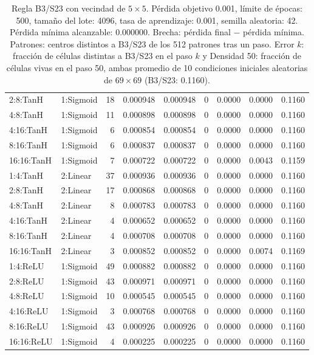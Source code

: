 \begin{table}[H]
\begin{tabular}{llrrrrrrr}
		2:8:TanH & 1:Sigmoid & 18 & 0.000948 & 0.000948 & 0 & 0.0000 & 0.0000 & 0.1160 \\
		4:8:TanH & 1:Sigmoid & 11 & 0.000898 & 0.000898 & 0 & 0.0000 & 0.0000 & 0.1160 \\
		4:16:TanH & 1:Sigmoid & 6 & 0.000854 & 0.000854 & 0 & 0.0000 & 0.0000 & 0.1160 \\
		8:16:TanH & 1:Sigmoid & 6 & 0.000837 & 0.000837 & 0 & 0.0000 & 0.0000 & 0.1160 \\
		16:16:TanH & 1:Sigmoid & 7 & 0.000722 & 0.000722 & 0 & 0.0000 & 0.0043 & 0.1159 \\
		\midrule
		1:4:TanH & 2:Linear & 37 & 0.000936 & 0.000936 & 0 & 0.0000 & 0.0000 & 0.1160 \\
		2:8:TanH & 2:Linear & 17 & 0.000868 & 0.000868 & 0 & 0.0000 & 0.0000 & 0.1160 \\
		4:8:TanH & 2:Linear & 8 & 0.000783 & 0.000783 & 0 & 0.0000 & 0.0000 & 0.1160 \\
		4:16:TanH & 2:Linear & 4 & 0.000652 & 0.000652 & 0 & 0.0000 & 0.0000 & 0.1160 \\
		8:16:TanH & 2:Linear & 4 & 0.000708 & 0.000708 & 0 & 0.0000 & 0.0000 & 0.1160 \\
		16:16:TanH & 2:Linear & 3 & 0.000852 & 0.000852 & 0 & 0.0000 & 0.0074 & 0.1169 \\
		\midrule
		1:4:ReLU & 1:Sigmoid & 49 & 0.000882 & 0.000882 & 0 & 0.0000 & 0.0000 & 0.1160 \\
		2:8:ReLU & 1:Sigmoid & 43 & 0.000971 & 0.000971 & 0 & 0.0000 & 0.0000 & 0.1160 \\
		4:8:ReLU & 1:Sigmoid & 10 & 0.000545 & 0.000545 & 0 & 0.0000 & 0.0000 & 0.1160 \\
		4:16:ReLU & 1:Sigmoid & 3 & 0.000768 & 0.000768 & 0 & 0.0000 & 0.0000 & 0.1160 \\
		8:16:ReLU & 1:Sigmoid & 43 & 0.000926 & 0.000926 & 0 & 0.0000 & 0.0000 & 0.1160 \\
		16:16:ReLU & 1:Sigmoid & 4 & 0.000225 & 0.000225 & 0 & 0.0000 & 0.0000 & 0.1160 \\
		\bottomrule
	\end{tabular}
	\caption{Regla B3/S23 con vecindad de $5\times5$. Pérdida objetivo 0.001, límite de épocas: 500, tamaño del lote: 4096, tasa de aprendizaje: 0.001, semilla aleatoria: 42. Pérdida mínima alcanzable: 0.000000. Brecha: pérdida final $-$ pérdida mínima. Patrones: centros distintos a B3/S23 de los 512 patrones tras un paso. Error $k$: fracción de células distintas a B3/S23 en el paso $k$ y Densidad 50: fracción de células vivas en el paso 50, ambas promedio de 10 condiciones iniciales aleatorias de $69\times69$ (B3/S23: 0.1160).}
	\label{tab:vecindad_5x5}
\end{table}
